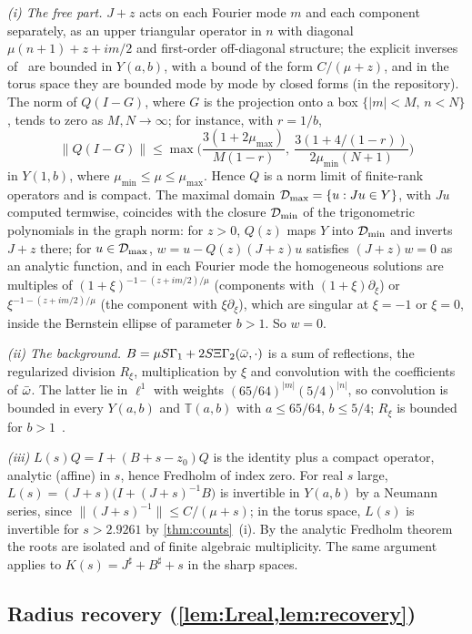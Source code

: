 \emph{(i) The free part.} $J+z$ acts on each Fourier mode $m$ and each component separately, as an upper triangular
operator in $n$ with diagonal $\mu(n+1)+z+im/2$ and first-order off-diagonal structure; the explicit inverses
of~\cite[\S3]{RT2019} are bounded in $Y(a,b)$, with a bound of the form $C/(\mu+z)$, and in the torus space they are
bounded mode by mode by closed forms (in the repository). The norm of $Q(I-G)$, where $G$ is the projection
onto a box $\{|m|<M,\,n<N\}$, tends to zero as $M,N\to\infty$; for instance, with $r=1/b$,
\[
  \|Q(I-G)\|\le\max\Big(\frac{3(1+2\mu_{\max})}{M(1-r)},\ \frac{3(1+4/(1-r))}{2\mu_{\min}(N+1)}\Big)
\]
in $Y(1,b)$, where $\mu_{\min}\le\mu\le\mu_{\max}$. Hence $Q$ is a norm limit of finite-rank operators and is compact.
The maximal domain $\mathcal{D}_{\max}=\{u:Ju\in Y\}$, with $Ju$ computed termwise, coincides with the closure
$\mathcal{D}_{\min}$ of the trigonometric polynomials in the graph norm: for $z>0$, $Q(z)$ maps $Y$ into $\mathcal{D}_{\min}$ and
inverts $J+z$ there; for $u\in\mathcal{D}_{\max}$, $w=u-Q(z)(J+z)u$ satisfies $(J+z)w=0$ as an analytic function, and in
each Fourier mode the homogeneous solutions are multiples of $(1+\xi)^{-1-(z+im/2)/\mu}$ (components with
$(1+\xi)\partial_\xi$) or $\xi^{-1-(z+im/2)/\mu}$ (the component with $\xi\partial_\xi$), which are singular at
$\xi=-1$ or $\xi=0$, inside the Bernstein ellipse of parameter $b>1$. So $w=0$.

\emph{(ii) The background.} $B=\mu S\Gamma_1+2S\Xi\Gamma_2(\bar\omega,\cdot)$ is a sum of reflections, the regularized
division $R_\xi$, multiplication by $\xi$ and convolution with the coefficients of $\bar\omega$. The latter lie in
$\ell^1$ with weights $(65/64)^{|m|}(5/4)^{|n|}$, so convolution is bounded in every $Y(a,b)$ and $\mathbb T(a,b)$
with $a\le65/64$, $b\le5/4$; $R_\xi$ is bounded for $b>1$~\cite[\S4]{RT2019}.

\emph{(iii)} $L(s)Q=I+(B+s-z_0)Q$ is the identity plus a compact operator, analytic (affine) in $s$, hence Fredholm of
index zero. For real $s$ large, $L(s)=(J+s)\big(I+(J+s)^{-1}B\big)$ is invertible in $Y(a,b)$ by a Neumann series, since
$\|(J+s)^{-1}\|\le C/(\mu+s)$; in the torus space, $L(s)$ is invertible for $s>2.9261$ by \cref{thm:counts}~(i). By the analytic Fredholm theorem the roots are isolated and of finite algebraic multiplicity. The same
argument applies to $K(s)=J^\sharp+B^\sharp+s$ in the sharp spaces.

\subsection{Radius recovery (\cref{lem:Lreal,lem:recovery})}\label{app:recovery}

